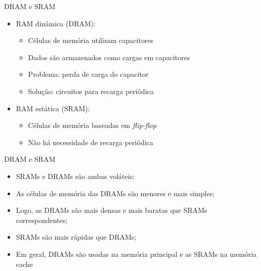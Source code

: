 \begin{slide}{DRAM e SRAM}
   \begin{itemize}
      \item RAM dinâmica (DRAM):
      \begin{itemize}
         \item Células de memória utilizam capacitores
         \item Dados são armazenados como cargas em capacitores
         \item Problema: perda de carga do capacitor
         \item Solução: circuitos para recarga periódica
      \end{itemize}
      \item RAM estática (SRAM):
      \begin{itemize}
         \item Células de memória baseadas em \textit{flip-flop}
         \item Não há necessidade de recarga periódica
      \end{itemize}
   \end{itemize}
\end{slide}

\begin{slide}{DRAM e SRAM}
   \begin{itemize}
      \item SRAMs e DRAMs são ambas voláteis;
      \item As células de memória das DRAMs são menores e mais simples;\pause
      \item Logo, as DRAMs são mais densas e mais baratas que SRAMs correspondentes;\pause
      \item SRAMs são mais rápidas que DRAMs; \pause
      \item Em geral, DRAMs são usadas na memória principal e as SRAMs na memória cache
   \end{itemize}
\end{slide}

